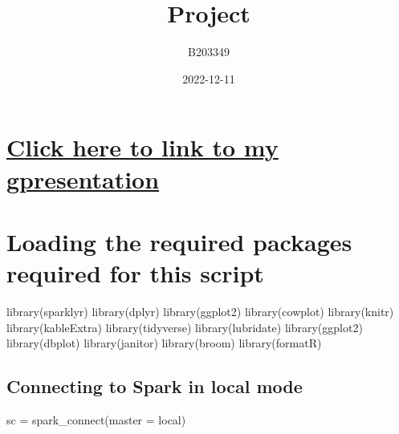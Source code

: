 \documentclass[
]{article}
\title{Project}
\author{B203349}
\date{2022-12-11}
\newenvironment{Shaded}{\begin{snugshade}}{\end{snugshade}}
\newcommand{\AttributeTok}[1]{\textcolor[rgb]{0.77,0.63,0.00}{#1}}
\newcommand{\FunctionTok}[1]{\textcolor[rgb]{0.00,0.00,0.00}{#1}}
\newcommand{\NormalTok}[1]{#1}
\newcommand{\OtherTok}[1]{\textcolor[rgb]{0.56,0.35,0.01}{#1}}
\newcommand{\StringTok}[1]{\textcolor[rgb]{0.31,0.60,0.02}{#1}}
\begin{document}
\maketitle

{
\setcounter{tocdepth}{2}
\tableofcontents
}
\hypertarget{click-here-to-link-to-my-gpresentation}{%
\section{\texorpdfstring{\href{https://github.com/B203349/B203349_assessment}{Click
here to link to my
gpresentation}}{Click here to link to my gpresentation}}\label{click-here-to-link-to-my-gpresentation}}

\hypertarget{loading-the-required-packages-required-for-this-script}{%
\section{Loading the required packages required for this
script}\label{loading-the-required-packages-required-for-this-script}}

\begin{Shaded}
\begin{Highlighting}[]
\FunctionTok{library}\NormalTok{(sparklyr)}
\FunctionTok{library}\NormalTok{(dplyr)}
\FunctionTok{library}\NormalTok{(ggplot2)}
\FunctionTok{library}\NormalTok{(cowplot)}
\FunctionTok{library}\NormalTok{(knitr)}
\FunctionTok{library}\NormalTok{(kableExtra)}
\FunctionTok{library}\NormalTok{(tidyverse) }
\FunctionTok{library}\NormalTok{(lubridate) }
\FunctionTok{library}\NormalTok{(ggplot2)}
\FunctionTok{library}\NormalTok{(dbplot)}
\FunctionTok{library}\NormalTok{(janitor)}
\FunctionTok{library}\NormalTok{(broom)}
\FunctionTok{library}\NormalTok{(formatR)}
\end{Highlighting}
\end{Shaded}

\hypertarget{connecting-to-spark-in-local-mode}{%
\subsection{Connecting to Spark in local
mode}\label{connecting-to-spark-in-local-mode}}

\begin{Shaded}
\begin{Highlighting}[]
\NormalTok{sc }\OtherTok{=} \FunctionTok{spark\_connect}\NormalTok{(}\AttributeTok{master =} \StringTok{\textquotesingle{}local\textquotesingle{}}\NormalTok{)}
\end{Highlighting}
\end{Shaded}
\end{document}
